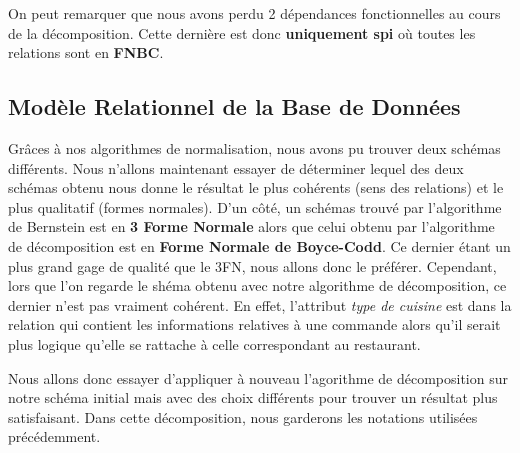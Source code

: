 \documentclass[french]{article}
\begin{document}
            \noindent
            On peut remarquer que nous avons perdu 2 dépendances fonctionnelles au cours de la décomposition. Cette dernière est donc \textbf{uniquement spi} où toutes les relations sont en \textbf{FNBC}.
            
        \subsection*{Modèle Relationnel de la Base de Données}
            Grâces à nos algorithmes de normalisation, nous avons pu trouver deux schémas différents. Nous n'allons maintenant essayer de déterminer lequel des deux schémas obtenu nous donne le résultat le plus cohérents (sens des relations) et le plus qualitatif (formes normales).\newline
            D'un côté, un schémas trouvé par l'algorithme de Bernstein est en \textbf{3 Forme Normale} alors que celui obtenu par l'algorithme de décomposition est en \textbf{Forme Normale de Boyce-Codd}. Ce dernier étant un plus grand gage de qualité que le 3FN, nous allons donc le préférer.\newline
            Cependant, lors que l'on regarde le shéma obtenu avec notre algorithme de décomposition, ce dernier n'est pas vraiment cohérent. En effet, l'attribut \emph{type de cuisine} est dans la relation qui contient les informations relatives à une commande alors qu'il serait plus logique qu'elle se rattache à celle correspondant au restaurant.\medskip

            Nous allons donc essayer d'appliquer à nouveau l'agorithme de décomposition sur notre schéma initial mais avec des choix différents pour trouver un résultat plus satisfaisant. Dans cette décomposition, nous garderons les notations utilisées précédemment.
            
\end{document}
